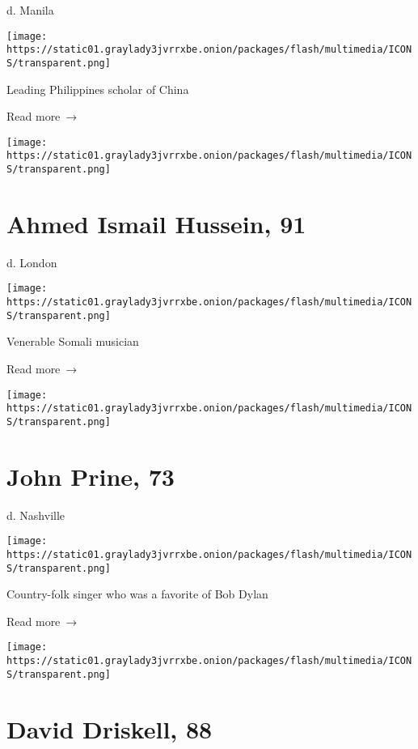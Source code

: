 d. Manila

\texttt{[image: https://static01.graylady3jvrrxbe.onion/packages/flash/multimedia/ICONS/transparent.png]}

Leading Philippines scholar of China

 Read more~→

\href{https://www.nytimes3xbfgragh.onion/2020/04/08/obituaries/ahmed-ismail-hussein-dead-coronavirus.html}{}

\texttt{[image: https://static01.graylady3jvrrxbe.onion/packages/flash/multimedia/ICONS/transparent.png]}

\hypertarget{ahmed-ismail-hussein-91}{%
\section{Ahmed Ismail Hussein, 91}\label{ahmed-ismail-hussein-91}}

d. London

\texttt{[image: https://static01.graylady3jvrrxbe.onion/packages/flash/multimedia/ICONS/transparent.png]}

Venerable Somali musician

 Read more~→

\href{https://www.nytimes3xbfgragh.onion/2020/04/07/arts/music/john-prine-dead-coronavirus.html}{}

\texttt{[image: https://static01.graylady3jvrrxbe.onion/packages/flash/multimedia/ICONS/transparent.png]}

\hypertarget{john-prine-73}{%
\section{John Prine, 73}\label{john-prine-73}}

d. Nashville

\texttt{[image: https://static01.graylady3jvrrxbe.onion/packages/flash/multimedia/ICONS/transparent.png]}

Country-folk singer who was a favorite of Bob Dylan

 Read more~→

\href{https://www.nytimes3xbfgragh.onion/2020/04/07/obituaries/david-driskell-dead.html}{}

\texttt{[image: https://static01.graylady3jvrrxbe.onion/packages/flash/multimedia/ICONS/transparent.png]}

\hypertarget{david-driskell-88}{%
\section{David Driskell, 88}\label{david-driskell-88}}

